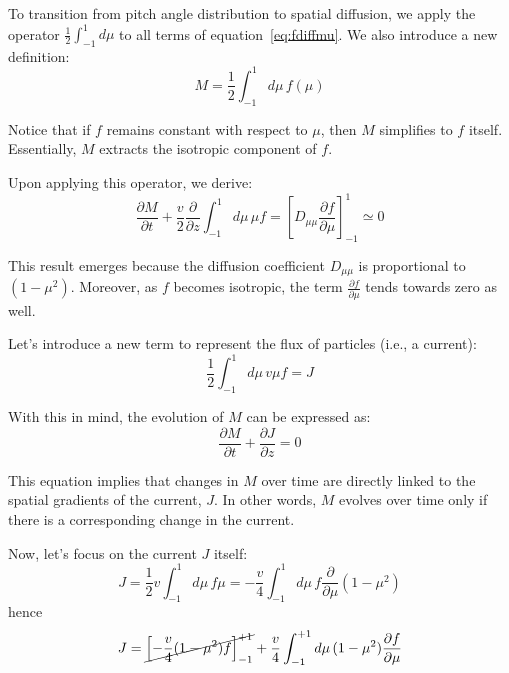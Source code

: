 To transition from pitch angle distribution to spatial diffusion, we apply the operator \(\frac{1}{2}\int_{-1}^{1} d\mu\) to all terms of equation~\eqref{eq:fdiffmu}. We also introduce a new definition:
%
\begin{equation}\label{eq:Mdef}
M = \frac{1}{2}\int_{-1}^1 d\mu \, f(\mu)
\end{equation}

Notice that if \( f \) remains constant with respect to \( \mu \), then \( M \) simplifies to \( f \) itself. Essentially, \( M \) extracts the isotropic component of \( f \).

Upon applying this operator, we derive:
%
\begin{equation}
\frac{\partial M}{\partial t} +\frac{v}{2}\frac{\partial}{\partial z}\int_{-1}^1 d\mu \, \mu f= \left[ {D_{\mu\mu}\frac{\partial f}{\partial \mu}} \right]_{-1}^{1} \simeq 0
\end{equation}

This result emerges because the diffusion coefficient \( D_{\mu\mu} \) is proportional to \( (1-\mu^2) \). Moreover, as \( f \) becomes isotropic, the term \( \frac{\partial f}{\partial \mu} \) tends towards zero as well. 

Let's introduce a new term to represent the flux of particles (i.e., a current):
%
\begin{equation}\label{eq:defj}
\frac{1}{2}\int_{-1}^1 d\mu \, v\mu f = J
\end{equation}

With this in mind, the evolution of \( M \) can be expressed as:
%
\begin{equation}\label{eq:jmcont}
\frac{\partial M}{\partial t} + \frac{\partial J}{\partial z} = 0
\end{equation}

This equation implies that changes in \( M \) over time are directly linked to the spatial gradients of the current, \( J \). In other words, \( M \) evolves over time only if there is a corresponding change in the current.

Now, let's focus on the current \( J \) itself:
%
\begin{equation}
J 
= \frac{1}{2} v\int_{-1}^1 d\mu \, f\mu  
= -\frac{v}{4}\int_{-1}^1 d\mu \, f\frac{\partial}{\partial \mu}(1-\mu^2) 
\end{equation}
%
hence
%
\begin{equation}\label{eq:jpartialmu}
J = \cancel{\left[ -\frac{v}{4}(1-\mu^2)f \right]_{-1}^{+1}} + \frac{v}{4}\int_{-1}^{+1} d\mu \, (1-\mu^2) \frac{\partial f}{\partial \mu}
\end{equation}

